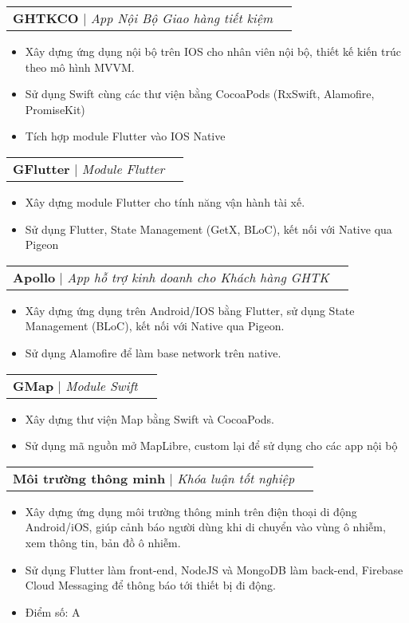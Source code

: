 \documentclass[letterpaper,11pt]{article}
\makeatletter
\newcommand{\resumeItem}[1]{
  \item\small{
    {#1 \vspace{-2pt}}
  }
}
\newcommand{\resumeProjectHeading}[2]{
    \vspace{-2pt}\item
    \begin{tabular*}{0.97\textwidth}{l@{\extracolsep{\fill}}r}
      \small#1 & #2 \\
    \end{tabular*}\vspace{-7pt}
}
\newcommand{\resumeItemListStart}{\begin{itemize}}
\newcommand{\resumeItemListEnd}{\end{itemize}\vspace{-5pt}}
\makeatother
\begin{document}
      \resumeProjectHeading
        {\textbf{GHTKCO} $|$ \emph{App Nội Bộ Giao hàng tiết kiệm}
        }{}
          \resumeItemListStart
            \resumeItem{Xây dựng ứng dụng nội bộ trên IOS cho nhân viên nội bộ, thiết kế kiến trúc theo mô hình MVVM.}
            \resumeItem{Sử dụng Swift cùng các thư viện bằng CocoaPods (RxSwift, Alamofire, PromiseKit)}
            \resumeItem{Tích hợp module Flutter vào IOS Native}
          \resumeItemListEnd
    \resumeProjectHeading
        {\textbf{GFlutter} $|$ \emph{Module Flutter}
        }{}
          \resumeItemListStart
            \resumeItem{Xây dựng module Flutter cho tính năng vận hành tài xế.}
            \resumeItem{Sử dụng Flutter, State Management (GetX, BLoC), kết nối với Native qua Pigeon}
          \resumeItemListEnd
    \resumeProjectHeading
        {\textbf{Apollo} $|$ \emph{App hỗ trợ kinh doanh cho Khách hàng GHTK}
        }{}
          \resumeItemListStart
            \resumeItem{Xây dựng ứng dụng trên Android/IOS bằng Flutter, sử dụng State Management (BLoC), kết nối với Native qua Pigeon.}
            \resumeItem{Sử dụng Alamofire để làm base network trên native.}
          \resumeItemListEnd
    \resumeProjectHeading
        {\textbf{GMap} $|$ \emph{Module Swift}
        }{}
          \resumeItemListStart
            \resumeItem{Xây dựng thư viện Map bằng Swift và CocoaPods.}
            \resumeItem{Sử dụng mã nguồn mở MapLibre, custom lại để sử dụng cho các app nội bộ}
          \resumeItemListEnd
    \resumeProjectHeading
        {\textbf{Môi trường thông minh} $|$ \emph{Khóa luận tốt nghiệp}
        }{}
          \resumeItemListStart
            \resumeItem{Xây dựng ứng dụng môi trường thông minh trên điện thoại di động Android/iOS, giúp cảnh báo người dùng khi di chuyển vào vùng ô nhiễm, xem thông tin, bản đồ ô nhiễm.}
            \resumeItem{Sử dụng Flutter làm front-end, NodeJS và MongoDB làm back-end, Firebase Cloud Messaging để thông báo tới thiết bị đi động.}
            \resumeItem{Điểm số: A}
          \resumeItemListEnd
      
      
      
\end{document}
